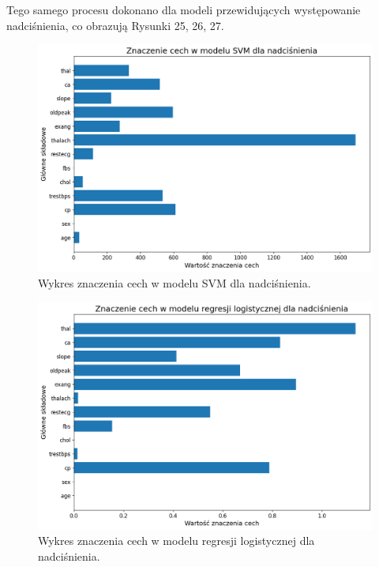 \documentclass[onecolumn,12pt]{article}
\begin{document}
\noindent
Tego samego procesu dokonano dla modeli przewidujących występowanie nadciśnienia, co obrazują Rysunki 25, 26, 27.

\begin{figure}[H]
    \centering
    \includegraphics[width=0.90\linewidth]{raport/graphs/nadcisnienie_svm.png}
    \captionsetup{justification=centering}
    \caption{Wykres znaczenia cech w modelu SVM dla nadciśnienia.}
\end{figure}

\begin{figure}[H]
    \centering
    \includegraphics[width=0.90\linewidth]{raport/graphs/nadcisnienie_regresja.png}
    \captionsetup{justification=centering}
    \caption{Wykres znaczenia cech w modelu regresji logistycznej dla nadciśnienia.}
\end{figure}
\end{document}
